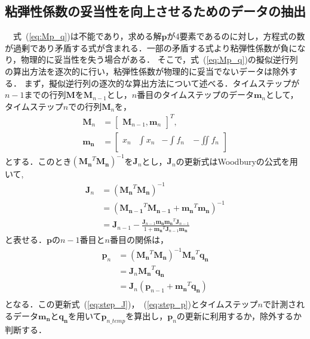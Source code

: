 \documentclass[a4paper]{jarticle}
\begin{document}
\subsection{粘弾性係数の妥当性を向上させるためのデータの抽出}\label{subsec:downsample}
　式~(\ref{eq:Mp_q})は不能であり，求める解$\mathbf{p}$が4要素であるのに対し，方程式の数が過剰であり矛盾する式が含まれる．一部の矛盾する式より粘弾性係数が負になり，物理的に妥当性を失う場合がある．
そこで，式~(\ref{eq:Mp_q})の擬似逆行列の算出方法を逐次的に行い，粘弾性係数が物理的に妥当でないデータは除外する．
まず，擬似逆行列の逐次的な算出方法について述べる．タイムステップが$n-1$までの行列$\mathbf{M}$を$\mathbf{M}_{n-1}$とし，$n$番目のタイムステップのデータ$\mathbf{m}_n$として，タイムステップ$n$での行列$\mathbf{M}_n$を，
\begin{equation}
    \begin{aligned}
        \mathbf{M}_n &= \begin{bmatrix}
            \mathbf{M}_{n-1} ,\mathbf{m}_n
        \end{bmatrix}^{T},\\
        \mathbf{m_{n}}&=\begin{bmatrix}
            x_{n} & \int{x_{n}} & -\int{f_{n}}\ & -\iint{f_{n}}\\
        \end{bmatrix}
    \end{aligned}
\end{equation}
とする．このとき$(\mathbf{M_{n}}^{T}\mathbf{M_{n}})^{-1}$を$\mathbf{J}_{n}$とし，$\mathbf{J}_{n}$の更新式はWoodburyの公式を用いて,
\begin{equation}
    \begin{aligned}
    \mathbf{J}_n &= (\mathbf{M_{n}}^{T}\mathbf{M_{n}})^{-1}\\
                 &= (\mathbf{M_{n-1}}^{T}\mathbf{M_{n-1}} + \mathbf{m_{n}}^{T}\mathbf{m_{n}})^{-1}\\
                 &= \mathbf{J}_{n-1} - \frac{\mathbf{J}_{n-1}\mathbf{m_{n}}\mathbf{m_{n}}^{T}\mathbf{J}_{n-1}}{1+\mathbf{m_{n}}^{T}\mathbf{J}_{n-1}\mathbf{m_{n}}}
    \end{aligned}
    \label{eq:step_J}
\end{equation}
と表せる．$\mathbf{p}$の$n-1$番目と$n$番目の関係は，
\begin{equation}
    \begin{aligned}
    \mathbf{p}_n &= (\mathbf{M_{n}}^{T}\mathbf{M_{n}})^{-1}\mathbf{M_{n}}^{T}\mathbf{q_{n}}\\
                 &= \mathbf{J}_{n}\mathbf{M_{n}}^{T}\mathbf{q_{n}}\\
                 &= \mathbf{J}_{n}(\mathbf{p}_{n-1}+\mathbf{m_{n}}^{T}\mathbf{q_{n}})\\
    \end{aligned}
    \label{eq:step_p}
\end{equation}
となる．この更新式~(\ref{eq:step_J})，~(\ref{eq:step_p})とタイムステップ$n$で計測されるデータ$\mathbf{m_{n}}$と$\mathbf{q_{n}}$を用いて$\mathbf{p}_{n\_temp}$を算出し，$\mathbf{p}_{n}$の更新に利用するか，除外するか判断する．
\end{document}
